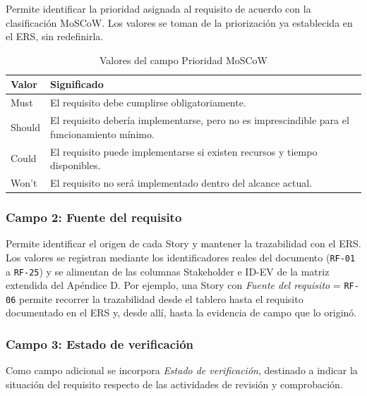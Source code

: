 \documentclass[journal,onecolumn]{IEEEtran}
\begin{document}
	Permite identificar la prioridad asignada al requisito de acuerdo con la clasificación MoSCoW. Los
	valores se toman de la priorización ya establecida en el ERS, sin redefinirla.
	
	\begin{table}[H]
		\centering
		\caption{Valores del campo Prioridad MoSCoW}
		\label{tab:moscow}
		\begin{tabular}{L{2.2cm} L{10.5cm}}
			\toprule
			\textbf{Valor} & \textbf{Significado} \\
			\midrule
			Must   & El requisito debe cumplirse obligatoriamente. \\
			Should & El requisito debería implementarse, pero no es imprescindible para el
			funcionamiento mínimo. \\
			Could  & El requisito puede implementarse si existen recursos y tiempo disponibles. \\
			Won't  & El requisito no será implementado dentro del alcance actual. \\
			\bottomrule
		\end{tabular}
	\end{table}
	
	\subsubsection{Campo 2: Fuente del requisito}
	
	Permite identificar el origen de cada Story y mantener la trazabilidad con el ERS. Los valores se
	registran mediante los identificadores reales del documento (\texttt{RF-01} a \texttt{RF-25}) y se
	alimentan de las columnas Stakeholder e ID-EV de la matriz extendida del Apéndice D. Por ejemplo,
	una Story con \emph{Fuente del requisito} = \texttt{RF-06} permite recorrer la trazabilidad desde
	el tablero hasta el requisito documentado en el ERS y, desde allí, hasta la evidencia de campo que
	lo originó.
	
	\subsubsection{Campo 3: Estado de verificación}
	
	Como campo adicional se incorpora \emph{Estado de verificación}, destinado a indicar la situación
	del requisito respecto de las actividades de revisión y comprobación.
	
\end{document}
